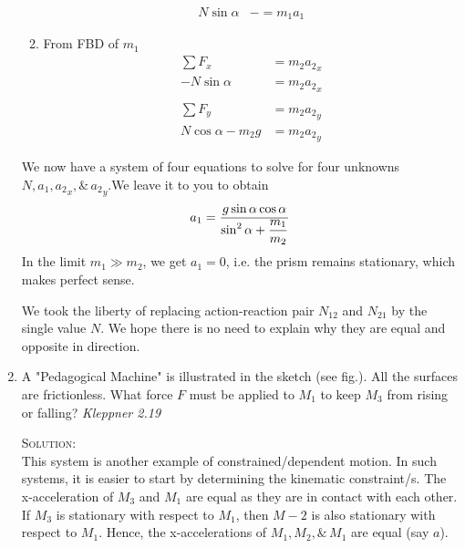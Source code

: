 \begin{enumerate}
\begin{enumerate}
\begin{align}
N\sin\alpha &-= m_1a_1 \label{eq38}
\end{align}
\item From FBD of $m_1$
\begin{align}
\sum F_x&=m_2{a_2}_x \nonumber\\
-N\sin\alpha&=m_2{a_2}_x \label{eq39}\\
\nonumber\\
\sum F_y&=m_2{a_2}_y \nonumber\\
N\cos\alpha-m_2g&=m_2{a_2}_y \label{eq40}
\end{align}
\end{enumerate}
We now have a system of four equations to solve for four unknowns $N,a_1,{a_2}_x,\text{\&}\,{a_2}_y$.We leave it to you to obtain
\[
a_1=\frac{\displaystyle g\sin\alpha\cos\alpha}{\displaystyle \sin^2\alpha+\frac{m_1}{m_2}}
\]
In the limit $m_1 \gg m_2$, we get $a_1 = 0$, i.e. the prism remains stationary, which makes perfect sense.
\begin{note}
We took the liberty of replacing action-reaction pair $N_{12}$ and $N_{21}$ by the single value $N$. We hope there is no need to explain why they are equal and opposite in direction.
\end{note}

\item A "Pedagogical Machine" is illustrated in the sketch (see fig.). All the surfaces are frictionless. What force $F$ must be applied to $M_1$ to keep $M_3$ from rising or falling? \hfill \textsl{Kleppner 2.19}
\begin{figure}[hbt]
    \centering
    
\end{figure}

\textsc{Solution:}\\
This system is another example of constrained/dependent motion. In such systems, it is easier to start by determining the kinematic constraint/s. The x-acceleration of $M_3$ and $M_1$ are equal as they are in contact with each other. If $M_3$ is stationary with respect to $M_1$, then $M-2$ is also stationary with respect to $M_1$. Hence, the x-accelerations of $M_1,M_2,\text{\&}\,M_1$ are equal (say $a$).
\begin{figure}[hbt]
    \centering
    
\end{figure}


\end{enumerate}
